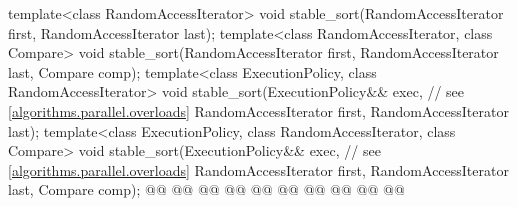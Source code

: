 \begin{codeblock}
{  template<class RandomAccessIterator>
    void stable_sort(RandomAccessIterator first, RandomAccessIterator last);
  template<class RandomAccessIterator, class Compare>
    void stable_sort(RandomAccessIterator first, RandomAccessIterator last,
                     Compare comp);
  template<class ExecutionPolicy, class RandomAccessIterator>
    void stable_sort(ExecutionPolicy&& exec, // see \ref{algorithms.parallel.overloads}
                     RandomAccessIterator first, RandomAccessIterator last);
  template<class ExecutionPolicy, class RandomAccessIterator, class Compare>
    void stable_sort(ExecutionPolicy&& exec, // see \ref{algorithms.parallel.overloads}
                     RandomAccessIterator first, RandomAccessIterator last,
                     Compare comp);
  @@
    @@
        @@
      @@
      @@
    @@
      @@
      @@
        @@
  @\added{\}}@

}
\end{codeblock}
